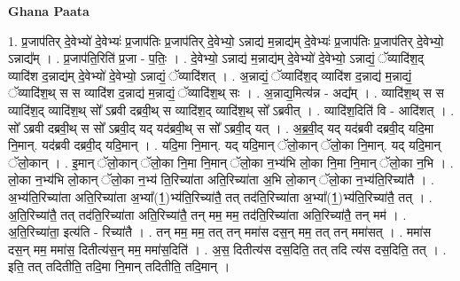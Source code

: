 \documentclass[17pt]{extarticle}
\begin{document}
\textbf{Ghana Paata } \newline

1. प्र॒जाप॑तिर् दे॒वेभ्यो॑ दे॒वेभ्यः॑ प्र॒जाप॑तिः प्र॒जाप॑तिर् दे॒वेभ्यो॒ ऽन्नाद्य॑ म॒न्नाद्य॑म् दे॒वेभ्यः॑ प्र॒जाप॑तिः प्र॒जाप॑तिर् दे॒वेभ्यो॒ ऽन्नाद्य᳚म् । . प्र॒जाप॑ति॒रिति॑ प्र॒जा - प॒तिः॒ । . दे॒वेभ्यो॒ ऽन्नाद्य॑ म॒न्नाद्य॑म् दे॒वेभ्यो॑ दे॒वेभ्यो॒ ऽन्नाद्यं॒ ॅव्यादि॑श॒द् व्यादि॑श द॒न्नाद्य॑म् दे॒वेभ्यो॑ दे॒वेभ्यो॒ ऽन्नाद्यं॒ ॅव्यादि॑शत् । . अ॒न्नाद्यं॒ ॅव्यादि॑श॒द् व्यादि॑श द॒न्नाद्य॑ म॒न्नाद्यं॒ ॅव्यादि॑श॒थ् स स व्यादि॑श द॒न्नाद्य॑ म॒न्नाद्यं॒ ॅव्यादि॑श॒थ् सः । . अ॒न्नाद्य॒मित्य॑न्न - अद्य᳚म् । . व्यादि॑श॒थ् स स व्यादि॑श॒द् व्यादि॑श॒थ् सो᳚ ऽब्रवी दब्रवी॒थ् स व्यादि॑श॒द् व्यादि॑श॒थ् सो᳚ ऽब्रवीत् । . व्यादि॑श॒दिति॑ वि - आदि॑शत् । . सो᳚ ऽब्रवी दब्रवी॒थ् स सो᳚ ऽब्रवी॒द् यद् यद॑ब्रवी॒थ् स सो᳚ ऽब्रवी॒द् यत् । . अ॒ब्र॒वी॒द् यद् यद॑ब्रवी दब्रवी॒द् यदि॒मा नि॒मान्. यद॑ब्रवी दब्रवी॒द् यदि॒मान् । . यदि॒मा नि॒मान्. यद् यदि॒मान् ॅलो॒कान् ॅलो॒का नि॒मान्. यद् यदि॒मान् ॅलो॒कान् । . इ॒मान् ॅलो॒कान् ॅलो॒का नि॒मा नि॒मान् ॅलो॒का न॒भ्य॑भि लो॒का नि॒मा नि॒मान् ॅलो॒का न॒भि । . लो॒का न॒भ्य॑भि लो॒कान् ॅलो॒का न॒भ्य॑ ति॒रिच्या॑ता अति॒रिच्या॑ता अ॒भि लो॒कान् ॅलो॒का न॒भ्य॑ति॒रिच्या॑तै । . अ॒भ्य॑ति॒रिच्या॑ता अति॒रिच्या॑ता अ॒भ्या᳚(1॒)भ्य॑ति॒रिच्या॑तै॒ तत् तद॑ति॒रिच्या॑ता अ॒भ्या᳚(1॒)भ्य॑ति॒रिच्या॑तै॒ तत् । . अ॒ति॒रिच्या॑तै॒ तत् तद॑ति॒रिच्या॑ता अति॒रिच्या॑तै॒ तन् मम॒ मम॒ तद॑ति॒रिच्या॑ता अति॒रिच्या॑तै॒ तन् मम॑ । . अ॒ति॒रिच्या॑ता॒ इत्य॑ति - रिच्या॑तै । . तन् मम॒ मम॒ तत् तन् ममा॑स दस॒न् मम॒ तत् तन् ममा॑सत् । . ममा॑स दस॒न् मम॒ ममा॑स॒ दितीत्य॑स॒न् मम॒ ममा॑स॒दिति॑ । . अ॒स॒ दितीत्य॑स दस॒दिति॒ तत् तदि त्य॑स दस॒दिति॒ तत् । . इति॒ तत् तदितीति॒ तदि॒मा नि॒मान् तदितीति॒ तदि॒मान् । \newline
\end{document}
